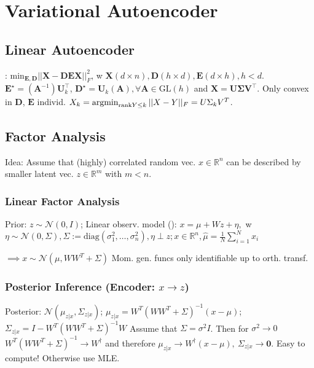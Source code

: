 \section{Variational Autoencoder}
\subsection*{Linear Autoencoder}
: $\text{min}_{\mathbf{E}, \mathbf{D}} ||\mathbf{X} - \mathbf{D}\mathbf{E} \mathbf{X}||^2_F$, w $\mathbf{X} (d \times n),\mathbf{D} (h \times d),\mathbf{E} (d \times h), h < d$.
$\mathbf{E}^{\star} = (\mathbf{A}^{-1})\mathbf{U}_k^{\top}$, $\mathbf{D}^{\star} = \mathbf{U}_k (\mathbf{A}), \forall\mathbf{A}\in\text{GL}(h)$ and $\mathbf{X} = \mathbf{U}\mathbf{\Sigma}\mathbf{V}^{\top}$.
Only convex in $\mathbf{D}$, $\mathbf{E}$ individ.
 $X_k=\operatorname*{argmin}_{\text{rank}Y\leq k}||X-Y||_F=U\Sigma_k V^T$.

\subsection*{Factor Analysis}
Idea: Assume that (highly) correlated random vec. $x \in \mathbb{R}^n$ can be described by smaller latent vec. $z \in \mathbb{R}^m$ with $m < n$.

\subsubsection*{Linear Factor Analysis}
Prior: $z\sim \mathcal{N}(0,I)$; Linear observ. model (): $x=\mu+Wz+\eta,$ w $ \eta\sim\mathcal{N}(0,\Sigma),\Sigma:=\text{diag}(\sigma^2_1,\dots,\sigma^2_n), \eta\perp z; x\in\mathbb{R}^n,\hat{\mu}=\frac{1}{N}\sum^N_{i=1}x_i$

$\implies x\sim\mathcal{N}(\mu,WW^T+\Sigma)$
 Mom. gen. funcs
 only identifiable up to orth. transf.

\subsubsection*{Posterior Inference (Encoder: $x \rightarrow z$)}
Posterior: $\mathcal{N}(\mu_{z|x},\Sigma_{z|x})$; $\mu_{z|x}=W^T(WW^T+\Sigma)^{-1}(x-\mu)$; $\Sigma_{z|x}=I-W^T(WW^T+\Sigma)^{-1}W$
Assume that $\Sigma = \sigma^2 I$. Then for $\sigma^2 \rightarrow 0$ $W^T(WW^T+\Sigma)^{-1} \rightarrow W^\dagger$ and therefore $\mu_{z|x} \rightarrow W^\dagger(x-\mu),\ \Sigma_{z|x} \rightarrow \textbf{0}$. Easy to compute! Otherwise use MLE.
